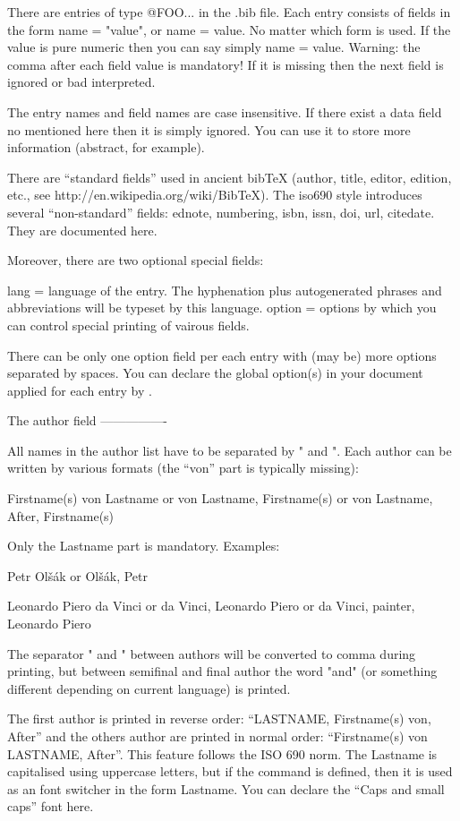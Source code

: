 There are entries of type @FOO{...} in the .bib file. Each entry consists of
fields in the form name = "value", or name = {value}. No matter which form is
used. If the value is pure numeric then you can say simply name = value.
Warning: the comma after each field value is mandatory! If it is missing then the
next field is ignored or bad interpreted.

The entry names and field names are case insensitive. If there exist a data
field no mentioned here then it is simply ignored. You can use it to store
more information (abstract, for example).

There are ``standard fields'' used in ancient bibTeX (author, title, editor, edition,
etc., see http://en.wikipedia.org/wiki/BibTeX). The iso690 style introduces
several ``non-standard'' fields: ednote, numbering, isbn, issn, doi, url, 
citedate. They are documented here.

Moreover, there are two optional special fields:

lang     = language of the entry. The hyphenation plus autogenerated phrases and
           abbreviations will be typeset by this language.
option   = options by which you can control special printing of vairous fields.

There can be only one option field per each entry with (may be) more options
separated by spaces. You can declare the global option(s) in your document
applied for each entry by \def\biboptions{...}.


The author field
----------------

All names in the author list have to be separated by " and ". Each author
can be written by various formats (the ``von'' part is typically missing):

  Firstname(s) von Lastname
  or
  von Lastname, Firstname(s)
  or
  von Lastname, After, Firstname(s)

Only the Lastname part is mandatory. Examples:

  Petr Olšák
  or
  Olšák, Petr

  Leonardo Piero da Vinci
  or
  da Vinci, Leonardo Piero
  or
  da Vinci, painter, Leonardo Piero

The separator " and " between authors will be converted to comma during
printing, but between semifinal and final author the word "and" (or something
different depending on current language) is printed.

The first author is printed in reverse order: ``LASTNAME, Firstname(s) von,
After'' and the others author are printed in normal order: ``Firstname(s)
von LASTNAME, After''. This feature follows the ISO 690 norm. The Lastname
is capitalised using uppercase letters, but if the \sc command is defined,
then it is used as an font switcher in the form {\sc Lastname}. You can
declare the ``Caps and small caps'' font here.

